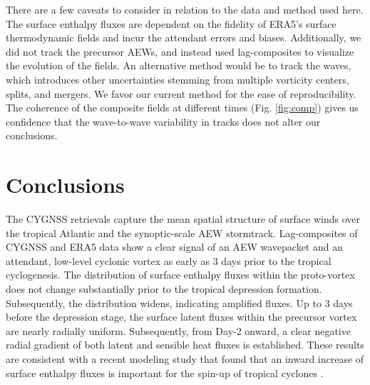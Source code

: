 \documentclass[draft]{agujournal2019}
\begin{document}
There are a few caveats to consider in relation to the data and method used here. The surface enthalpy fluxes are dependent on the fidelity of ERA5's surface thermodynamic fields and incur the attendant errors and biases. Additionally, we did not track the precursor AEWs, and instead used lag-composites to visualize the evolution of the fields. An alternative method would be to track the waves, which introduces other uncertainties stemming from multiple vorticity centers, splits, and mergers. We favor our current method 
for the ease of reproducibility. The coherence of the composite fields at different times (Fig. \ref{fig:comp}) gives us confidence that the wave-to-wave variability in tracks does not alter our conclusions.




\section{Conclusions}

The CYGNSS retrievals capture the mean spatial structure of surface winds over the tropical Atlantic and the synoptic-scale AEW stormtrack. Lag-composites of CYGNSS and ERA5 data show a clear signal of an AEW wavepacket and an attendant, low-level cyclonic vortex as early as 3 days prior to the tropical cyclogenesis. The distribution of surface enthalpy fluxes within the proto-vortex does not change substantially prior to the tropical depression formation. Subsequently, the distribution widens, indicating amplified fluxes. Up to 3 days before the  depression stage, the surface latent fluxes within the precursor vortex are nearly radially uniform. Subsequently, from Day-2 onward, a clear negative radial gradient of both latent and sensible heat fluxes is established. These results are consistent with a recent modeling study that found that an inward increase of surface enthalpy fluxes is important for the spin-up of tropical cyclones \cite{MB2018}.



%
\end{document}

